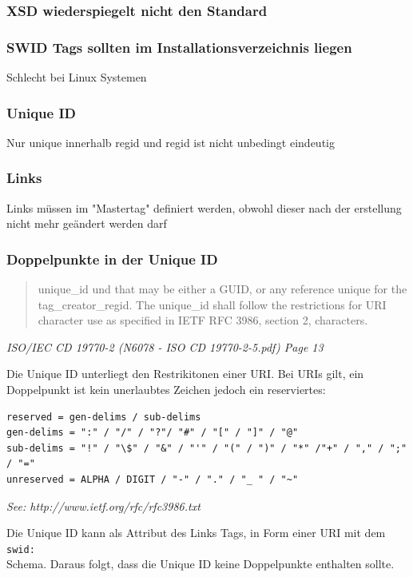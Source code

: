 \subsubsection{XSD wiederspiegelt nicht den Standard}

\subsubsection{SWID Tags sollten im Installationsverzeichnis liegen}
Schlecht bei Linux Systemen

\subsubsection{Unique ID}
Nur unique innerhalb regid und regid ist nicht unbedingt eindeutig

\subsubsection{Links}
Links müssen im "Mastertag" definiert werden, obwohl dieser nach der erstellung
nicht mehr geändert werden darf


\subsubsection{Doppelpunkte in der Unique ID} 
\begin{quote}
unique\_id und that may
be either a GUID, or any reference unique for the tag\_creator\_regid. The
unique\_id shall follow the restrictions for URI character use as specified in
IETF RFC 3986, section 2, characters. 
\end{quote} 
\textit{ISO/IEC CD 19770-2 (N6078 - ISO CD 19770-2-5.pdf) Page 13}

Die Unique ID unterliegt den Restrikitonen einer URI. Bei URIs gilt, ein
Doppelpunkt ist kein unerlaubtes Zeichen jedoch ein reserviertes:

\begin{verbatim} 
reserved = gen-delims / sub-delims 
gen-delims = ":" / "/" / "?"/ "#" / "[" / "]" / "@" 
sub-delims = "!" / "\$" / "&" / "'" / "(" / ")" / "*" /"+" / "," / ";" / "=" 
unreserved = ALPHA / DIGIT / "-" / "." / "_ " / "~"
\end{verbatim}

\textit{See: http://www.ietf.org/rfc/rfc3986.txt}

Die Unique ID kann als Attribut des Links Tags, in Form einer URI mit dem
\texttt{swid:\\} Schema. Daraus folgt, dass die Unique ID keine Doppelpunkte
enthalten sollte.
